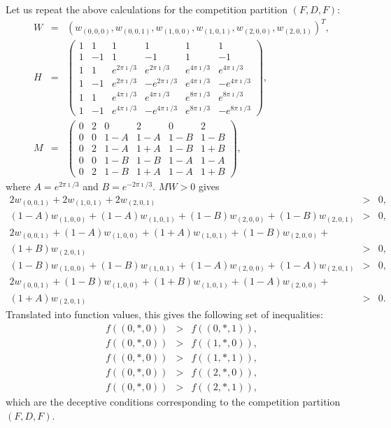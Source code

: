 \begin{example}
Let us repeat the above calculations for the competition partition
$(F,D,F)$:
\begin{eqnarray}
W&=&(w_{(0,0,0)},w_{(0,0,1)},w_{(1,0,0)},w_{(1,0,1)},w_{(2,0,0)},w_{(2,0,1)})^T,
	\nonumber\\
H&=&\left(\begin{array}{cccccc}
	1&1&1&1&1&1\\
	1&-1&1&-1&1&-1\\
	1&1&e^{2 \pi\imath/3}&e^{2\pi\imath/3}&e^{4\pi\imath/3}&
		e^{4\pi\imath/3}\\
	1&-1&e^{2\pi\imath/3}&-e^{2\pi\imath/3}&e^{4\pi\imath/3}&
		-e^{4\pi\imath/3}\\
	1&1&e^{4\pi\imath/3}&e^{4\pi\imath/3}&e^{8 \pi\imath/3}&
		e^{8\pi\imath/3}\\
	1&-1&e^{4\pi\imath/3}&-e^{4\pi\imath/3}&e^{8 \pi\imath/3}&
		-e^{8\pi\imath/3}
	\end{array} \right), \nonumber\\
M&=&\left(\begin{array}{cccccc}
	0&2&0&2&0&2\\
	0&0&1-A &1-A&1-B&1-B\\
	0&2&1-A&1+A&1-B&1+B\\
	0&0& 1-B&1-B &1-A&1-A\\
	0&2&1-B&1+A&1-A&1+B
\end{array} \right),
\end{eqnarray}
where $A=e^{2 \pi \imath/3}$ and $B=e^{-2 \pi \imath/3}$.  $MW>0$ gives
\begin{eqnarray}
2 w_{(0,0,1)} + 2 w_{(1,0,1)} + 2 w_{(2,0,1)} &>& 0,\nonumber\\
(1-A) w_{(1,0,0)} + (1-A) w_{(1,0,1)} + (1-B) w_{(2,0,0)}+(1-B) w_{(2,0,1)}&>&0,
	\nonumber\\
2 w_{(0,0,1)} + (1-A) w_{(1,0,0)} +(1+A) w_{(1,0,1)} + (1-B) w_{(2,0,0)} +&&
	\nonumber\\
	(1+B) w_{(2,0,1)} &>& 0, \nonumber\\
(1-B) w_{(1,0,0)} +(1-B)w_{(1,0,1)} + (1-A)w_{(2,0,0)}+(1-A)w_{(2,0,1)}&>&0,
	\nonumber\\
2 w_{(0,0,1)} +(1-B) w_{(1,0,0)} +(1+B) w_{(1,0,1)} +(1-A) w_{(2,0,0)}+&&
	\nonumber\\
	(1+A)w_{(2,0,1)} &>&0.
\end{eqnarray}
Translated into function values, this gives the following set of
inequalities:
\begin{eqnarray}
f((0,*,0)) &>& f((0,*,1)), \nonumber\\
f((0,*,0)) &>& f((1,*,0)), \nonumber\\
f((0,*,0)) &>& f((1,*,1)), \nonumber\\
f((0,*,0)) &>& f((2,*,0)), \nonumber\\
f((0,*,0)) &>& f((2,*,1)),
\end{eqnarray}
which are the deceptive conditions corresponding to the competition
partition $(F,D,F)$.
\end{example}

